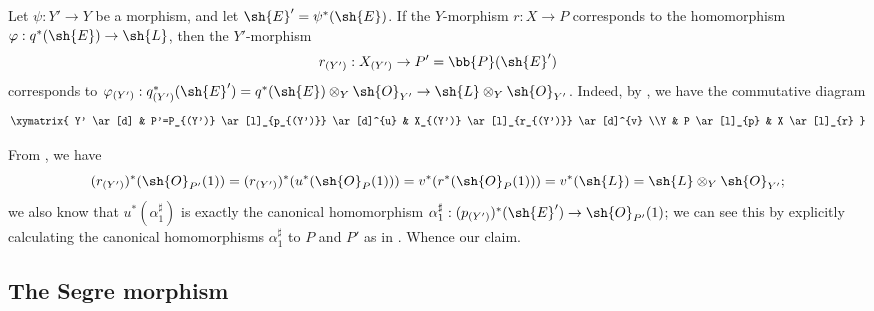 \begin{env}[4.2.10]
\label{II.4.2.10}
Let $\psi:Y'\to Y$ be a morphism, and let $\sh{E}'=\psi^*(\sh{E})$.
If the $Y$-morphism $r:X\to P$ corresponds to the homomorphism $\varphi:q^*(\sh{E})\to\sh{L}$, then the $Y'$-morphism
\[
  r_{(Y')}: X_{(Y')} \to P' = \bb{P}(\sh{E}')
\]
corresponds to $\varphi_{(Y')}:q_{(Y')}^*(\sh{E}') = q^*(\sh{E})\otimes_Y\sh{O}_{Y'} \to \sh{L}\otimes_Y\sh{O}_{Y'}$.
Indeed, by , we have the commutative diagram
\[
  \xymatrix{
    Y' \ar[d]
    & P'=P_{(Y')} \ar[l]_{p_{(Y')}} \ar[d]^{u}
    & X_{(Y')} \ar[l]_{r_{(Y')}} \ar[d]^{v}
  \\Y
    & P \ar[l]_{p}
    & X \ar[l]_{r}
  }
\]

From , we have
\[
  (r_{(Y')})^*(\sh{O}_{P'}(1)) = (r_{(Y')})^*(u^*(\sh{O}_P(1))) = v^*(r^*(\sh{O}_P(1))) = v^*(\sh{L}) = \sh{L}\otimes_Y\sh{O}_{Y'};
\]
we also know that $u^*(\alpha_1^\sharp)$ is exactly the canonical homomorphism $\alpha_1^\sharp:(p_{(Y')})^*(\sh{E}')\to\sh{O}_{P'}(1)$;
we can see this by explicitly calculating the canonical homomorphisms $\alpha_1^\sharp$ to $P$ and $P'$ as in .
Whence our claim.
\end{env}


\subsection{The Segre morphism}
\label{subsection:II.4.3}

